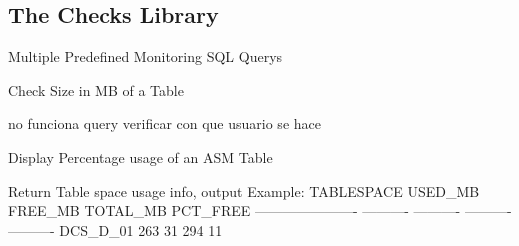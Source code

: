 \documentclass[letterpaper,10pt,english]{sphinxmanual}
\begin{document}
\subsection{The Checks Library}
\label{api:the-checks-library}\label{api:module-Checks}

\begin{fulllineitems}
\label{api:Checks.Checks}
Multiple Predefined Monitoring SQL Querys

\begin{fulllineitems}
\label{api:Checks.Checks.ChkSize}
Check Size in MB of a Table

\end{fulllineitems}


\begin{fulllineitems}
\label{api:Checks.Checks.ChkRows}
no funciona query verificar con que usuario se hace

\end{fulllineitems}


\begin{fulllineitems}
\label{api:Checks.Checks.asm_volume_use}
Display Percentage usage of an ASM Table

\end{fulllineitems}


\begin{fulllineitems}
\label{api:Checks.Checks.ChkTblSpace}
Return Table space usage info, output Example:
TABLESPACE                USED\_MB    FREE\_MB   TOTAL\_MB   PCT\_FREE
---------------------- ---------- ---------- ---------- ----------
DCS\_D\_01                      263         31        294         11

\end{fulllineitems}


\end{fulllineitems}
\end{document}
